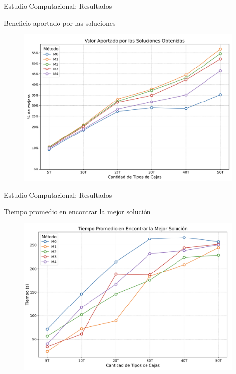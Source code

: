 \documentclass[handout]{beamer}
\begin{document}
\begin{frame}{Estudio Computacional: Resultados}
    \begin{exampleblock}{Beneficio aportado por las soluciones}
        \begin{figure}
            \centering
            \includegraphics[width=0.8\linewidth]{pic/exp-valor-aportado.png}
            \label{fig:valor-aportado}
        \end{figure}
    \end{exampleblock}
\end{frame}

\begin{frame}{Estudio Computacional: Resultados}
    \begin{exampleblock}{Tiempo promedio en encontrar la mejor solución}
        \begin{figure}
            \centering
            \includegraphics[width=0.8\linewidth]{pic/exp-tiempo-mejor-solucion.png}
            \label{fig:tiempo-mejor-solucion}
        \end{figure}
    \end{exampleblock}
\end{frame}
\end{document}
